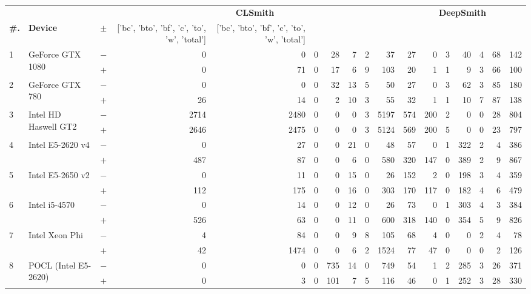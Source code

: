   \begin{tabular}{lll | rrrrrrr | rrrrrrr }
  \toprule
  & & & \multicolumn{7}{c|}{\textbf{CLSmith}} & \multicolumn{7}{c}{\textbf{DeepSmith}} \\
  \textbf{\#.} & \textbf{Device} & $\pm$ &
  ['bc', 'bto', 'bf', 'c', 'to', 'w', 'total'] &
  ['bc', 'bto', 'bf', 'c', 'to', 'w', 'total'] \\
  \midrule
  \multirow{ 2}{*}{1} & \multirow{ 2}{*}{GeForce GTX 1080} & $-$ & 0 & 0 & 0 & 28 & 7 & 2 & 37       & 27 & 0 & 3 & 40 & 4 & 68 & 142 \\& & $+$ & 0 & 71 & 0 & 17 & 6 & 9 & 103 & 20 & 1 & 1 & 9 & 3 & 66 & 100 \\
\hline
\multirow{ 2}{*}{2} & \multirow{ 2}{*}{GeForce GTX 780} & $-$ & 0 & 0 & 0 & 32 & 13 & 5 & 50       & 27 & 0 & 3 & 62 & 3 & 85 & 180 \\& & $+$ & 26 & 14 & 0 & 2 & 10 & 3 & 55 & 32 & 1 & 1 & 10 & 7 & 87 & 138 \\
\hline
\multirow{ 2}{*}{3} & \multirow{ 2}{*}{Intel HD Haswell GT2} & $-$ & 2714 & 2480 & 0 & 0 & 0 & 3 & 5197       & 574 & 200 & 2 & 0 & 0 & 28 & 804 \\& & $+$ & 2646 & 2475 & 0 & 0 & 0 & 3 & 5124 & 569 & 200 & 5 & 0 & 0 & 23 & 797 \\
\hline
\multirow{ 2}{*}{4} & \multirow{ 2}{*}{Intel E5-2620 v4} & $-$ & 0 & 27 & 0 & 0 & 21 & 0 & 48       & 57 & 0 & 1 & 322 & 2 & 4 & 386 \\& & $+$ & 487 & 87 & 0 & 0 & 6 & 0 & 580 & 320 & 147 & 0 & 389 & 2 & 9 & 867 \\
\hline
\multirow{ 2}{*}{5} & \multirow{ 2}{*}{Intel E5-2650 v2} & $-$ & 0 & 11 & 0 & 0 & 15 & 0 & 26       & 152 & 2 & 0 & 198 & 3 & 4 & 359 \\& & $+$ & 112 & 175 & 0 & 0 & 16 & 0 & 303 & 170 & 117 & 0 & 182 & 4 & 6 & 479 \\
\hline
\multirow{ 2}{*}{6} & \multirow{ 2}{*}{Intel i5-4570} & $-$ & 0 & 14 & 0 & 0 & 12 & 0 & 26       & 73 & 0 & 1 & 303 & 4 & 3 & 384 \\& & $+$ & 526 & 63 & 0 & 0 & 11 & 0 & 600 & 318 & 140 & 0 & 354 & 5 & 9 & 826 \\
\hline
\multirow{ 2}{*}{7} & \multirow{ 2}{*}{Intel Xeon Phi} & $-$ & 4 & 84 & 0 & 0 & 9 & 8 & 105       & 68 & 4 & 0 & 0 & 2 & 4 & 78 \\& & $+$ & 42 & 1474 & 0 & 0 & 6 & 2 & 1524 & 77 & 47 & 0 & 0 & 0 & 2 & 126 \\
\hline
\multirow{ 2}{*}{8} & \multirow{ 2}{*}{POCL (Intel E5-2620)} & $-$ & 0 & 0 & 0 & 735 & 14 & 0 & 749       & 54 & 1 & 2 & 285 & 3 & 26 & 371 \\& & $+$ & 0 & 3 & 0 & 101 & 7 & 5 & 116 & 46 & 0 & 1 & 252 & 3 & 28 & 330 \\

\end{tabular}
